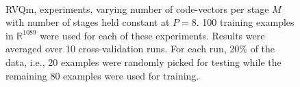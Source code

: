 \documentclass{article}
\begin{document}
								
								\begin{figure}[t]
								\\
								\caption{RVQm, experiments, varying number of code-vectors per stage $M$ with number of stages held constant at $P=8$. 100 training examples in $\mathbb{R}^{1089}$ were used for each of these experiments. Results were averaged over 10 cross-validation runs. For each run, 20\% of the data, i.e., 20 examples were randomly picked for testing while the remaining 80 examples were used for training.}
								\label{fig:RVQ_results_varyingM}
								\end{figure}
								
\end{document}
